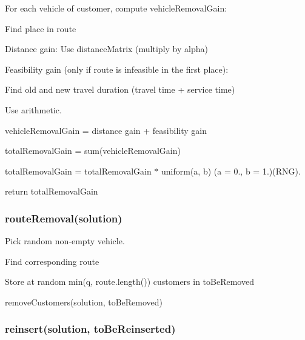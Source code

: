 \begin{DoxyEnumerate}
\item For each vehicle of customer, compute vehicle\+Removal\+Gain\+:
\begin{DoxyItemize}
\item Find place in route
\item Distance gain\+: Use distance\+Matrix (multiply by alpha)
\item Feasibility gain (only if route is infeasible in the first place)\+:
\begin{DoxyItemize}
\item Find old and new travel duration (travel time + service time)
\item Use arithmetic.
\end{DoxyItemize}
\item vehicle\+Removal\+Gain = distance gain + feasibility gain
\end{DoxyItemize}
\end{DoxyEnumerate}

total\+Removal\+Gain = sum(vehicle\+Removal\+Gain)
\begin{DoxyItemize}
\item total\+Removal\+Gain = total\+Removal\+Gain $\ast$ uniform(a, b) (a = 0., b = 1.)(R\+NG).
\end{DoxyItemize}

return total\+Removal\+Gain

\subsubsection*{route\+Removal(solution)}


\begin{DoxyEnumerate}
\item Pick random non-\/empty vehicle.
\item Find corresponding route
\item Store at random min(q, route.\+length()) customers in to\+Be\+Removed
\item remove\+Customers(solution, to\+Be\+Removed)
\end{DoxyEnumerate}

\subsubsection*{reinsert(solution, to\+Be\+Reinserted)}



